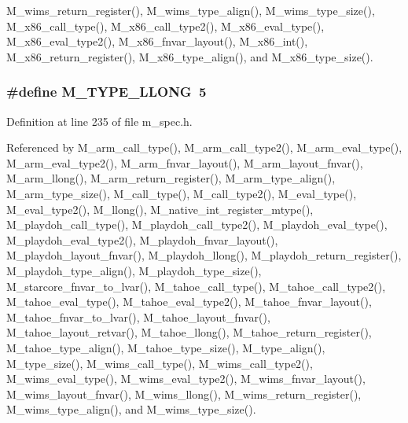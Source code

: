 M\_\-wims\_\-return\_\-register(), M\_\-wims\_\-type\_\-align(), M\_\-wims\_\-type\_\-size(), M\_\-x86\_\-call\_\-type(), M\_\-x86\_\-call\_\-type2(), M\_\-x86\_\-eval\_\-type(), M\_\-x86\_\-eval\_\-type2(), M\_\-x86\_\-fnvar\_\-layout(), M\_\-x86\_\-int(), M\_\-x86\_\-return\_\-register(), M\_\-x86\_\-type\_\-align(), and M\_\-x86\_\-type\_\-size().
\subsubsection{\setlength{\rightskip}{0pt plus 5cm}\#define M\_\-TYPE\_\-LLONG~5}\label{m__spec_8h_9617503a2168375b1fde450831d50365}




Definition at line 235 of file m\_\-spec.h.

Referenced by M\_\-arm\_\-call\_\-type(), M\_\-arm\_\-call\_\-type2(), M\_\-arm\_\-eval\_\-type(), M\_\-arm\_\-eval\_\-type2(), M\_\-arm\_\-fnvar\_\-layout(), M\_\-arm\_\-layout\_\-fnvar(), M\_\-arm\_\-llong(), M\_\-arm\_\-return\_\-register(), M\_\-arm\_\-type\_\-align(), M\_\-arm\_\-type\_\-size(), M\_\-call\_\-type(), M\_\-call\_\-type2(), M\_\-eval\_\-type(), M\_\-eval\_\-type2(), M\_\-llong(), M\_\-native\_\-int\_\-register\_\-mtype(), M\_\-playdoh\_\-call\_\-type(), M\_\-playdoh\_\-call\_\-type2(), M\_\-playdoh\_\-eval\_\-type(), M\_\-playdoh\_\-eval\_\-type2(), M\_\-playdoh\_\-fnvar\_\-layout(), M\_\-playdoh\_\-layout\_\-fnvar(), M\_\-playdoh\_\-llong(), M\_\-playdoh\_\-return\_\-register(), M\_\-playdoh\_\-type\_\-align(), M\_\-playdoh\_\-type\_\-size(), M\_\-starcore\_\-fnvar\_\-to\_\-lvar(), M\_\-tahoe\_\-call\_\-type(), M\_\-tahoe\_\-call\_\-type2(), M\_\-tahoe\_\-eval\_\-type(), M\_\-tahoe\_\-eval\_\-type2(), M\_\-tahoe\_\-fnvar\_\-layout(), M\_\-tahoe\_\-fnvar\_\-to\_\-lvar(), M\_\-tahoe\_\-layout\_\-fnvar(), M\_\-tahoe\_\-layout\_\-retvar(), M\_\-tahoe\_\-llong(), M\_\-tahoe\_\-return\_\-register(), M\_\-tahoe\_\-type\_\-align(), M\_\-tahoe\_\-type\_\-size(), M\_\-type\_\-align(), M\_\-type\_\-size(), M\_\-wims\_\-call\_\-type(), M\_\-wims\_\-call\_\-type2(), M\_\-wims\_\-eval\_\-type(), M\_\-wims\_\-eval\_\-type2(), M\_\-wims\_\-fnvar\_\-layout(), M\_\-wims\_\-layout\_\-fnvar(), M\_\-wims\_\-llong(), M\_\-wims\_\-return\_\-register(), M\_\-wims\_\-type\_\-align(), and M\_\-wims\_\-type\_\-size().
